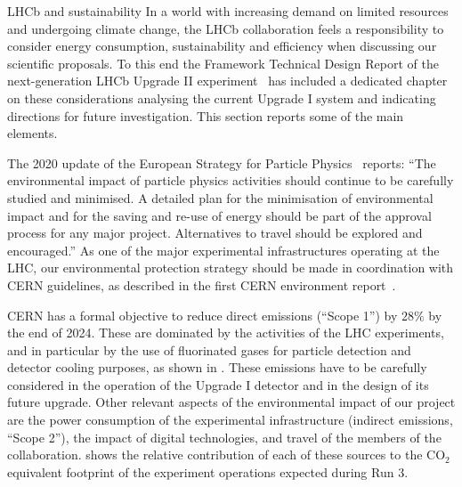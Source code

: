 \documentclass[../SustainableHEP.tex]{subfiles}
\begin{document}
\begin{casestudy}{LHCb and sustainability}%
\noindent In a world with increasing demand on limited resources and undergoing climate change, the LHCb collaboration feels a responsibility to consider energy consumption, sustainability and efficiency when discussing our scientific proposals. To this end the Framework Technical Design Report of the next-generation LHCb Upgrade II experiment~\cite{LHCbU2FTDR} has included a dedicated chapter on these considerations analysing the current Upgrade I system and indicating directions for future investigation. This section reports some of the main elements.  

The 2020 update of the European Strategy for Particle Physics~\cite{EuropeanStrategy2020} reports: ``The environmental impact of particle physics activities should continue to be carefully studied and minimised. A detailed plan for the minimisation of environmental impact and for the saving and re-use of energy should be part of the approval process for any major project. Alternatives to travel should be explored and encouraged.'' 
As one of the major experimental infrastructures operating at the LHC,  our environmental protection strategy should be made in coordination with CERN guidelines, as described in the first CERN environment report~\cite{envrep2020}.

CERN has a formal objective to reduce direct emissions (``Scope 1'') by $28\%$ by the end of 2024. These are dominated by the activities of the LHC experiments, and in particular by the use of fluorinated gases for particle detection and detector cooling purposes, as shown in . These emissions have to be carefully considered in the operation of the Upgrade I detector and in the design of its future upgrade. Other relevant aspects of the environmental impact of our project are the power consumption of the experimental infrastructure (indirect emissions, ``Scope 2''), the impact of digital technologies, and travel of the members of the collaboration.  shows the relative contribution of each of these sources to the CO$_2$ equivalent footprint of the experiment operations expected during Run 3. %


\end{casestudy}
\end{document}
